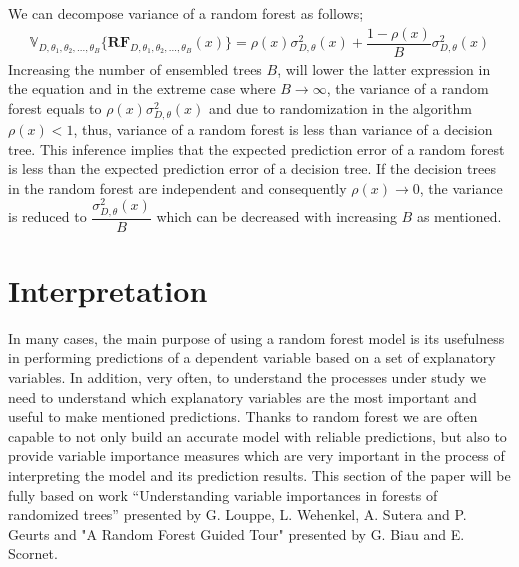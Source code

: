 We can decompose variance of a random forest as follows;
\begin{align}
\mathbb{V}_{D, \theta_{1}, \theta_{2},..., \theta_{B}}\{\boldsymbol{RF}_{D, \theta_{1},\theta_{2},..., \theta_{B}}(x) \}  = \rho(x)\sigma^2_{D,\theta}(x) + \dfrac{1-\rho(x)}{B}\sigma^2_{D,\theta}(x)
\end{align}
Increasing the number of ensembled trees $B$, will lower the latter expression in the equation and in the extreme case where $B \rightarrow \infty $, the variance of a random forest equals to $\rho(x)\sigma^2_{D,\theta}(x)$ and due to randomization in the algorithm $\rho(x) < 1$, thus, variance of a random forest is less than variance of a decision tree. This inference implies that the expected prediction error of a random forest is less than the expected prediction error of a decision tree. If the decision trees in the random forest are independent and consequently $\rho(x) \rightarrow 0$, the variance is reduced to $\dfrac{\sigma^2_{D,\theta}(x)}{B}$ which can be decreased with increasing $B$ as mentioned.



\section{Interpretation}
In many cases, the main purpose of using a random forest model is its usefulness in performing predictions of a dependent variable based on a set of explanatory variables. In addition, very often, to understand the processes under study we need to understand which explanatory variables are the most important and useful to make mentioned predictions. Thanks to random forest we are often capable to not only build an accurate model with reliable predictions, but also to provide variable importance measures which are very important in the process of interpreting the model and its prediction results. This section of the paper will be fully based on work “Understanding variable importances in forests of randomized trees” presented by G. Louppe, L. Wehenkel, A. Sutera and P. Geurts and "A Random Forest Guided Tour" presented by G. Biau and E. Scornet.

